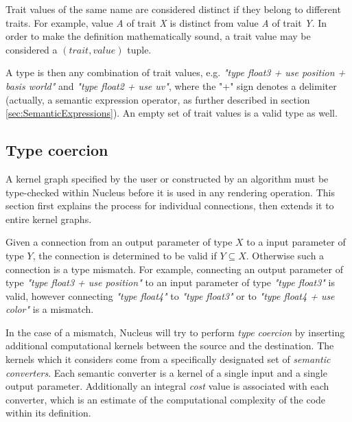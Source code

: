 Trait values of the same name are considered distinct if they belong to different traits. For example, value \emph{A} of trait \emph{X} is distinct from value \emph{A} of trait \emph{Y}. In order to make the definition mathematically sound, a trait value may be considered a $(trait, value)$ tuple.

A type is then any combination of trait values, e.g. \emph{"type float3 + use position + basis world"} and \emph{"type float2 + use uv"}, where the "+" sign denotes a delimiter (actually, a semantic expression operator, as further described in section \ref{sec:SemanticExpressions}). An empty set of trait values is a valid type as well.

\subsection{Type coercion}
\label{sec:TypeCoercion}

A kernel graph specified by the user or constructed by an algorithm must be type-checked within Nucleus before it is used in any rendering operation. This section first explains the process for individual connections, then extends it to entire kernel graphs.

Given a connection from an output parameter of type $X$ to a input parameter of type $Y$, the connection is determined to be valid if $Y \subseteq X$. Otherwise such a connection is a type mismatch. For example, connecting an output parameter of type \emph{"type float3 + use position"} to an input parameter of type \emph{"type float3"} is valid, however connecting \emph{"type float4"} to \emph{"type float3"} or to \emph{"type float4 + use color"} is a mismatch.

In the case of a mismatch, Nucleus will try to perform \emph{type coercion} by inserting additional computational kernels between the source and the destination. The kernels which it considers come from a specifically designated set of \emph{semantic converters}. Each semantic converter is a kernel of a single input and a single output parameter. Additionally an integral \emph{cost} value is associated with each converter, which is an estimate of the computational complexity of the code within its definition.

